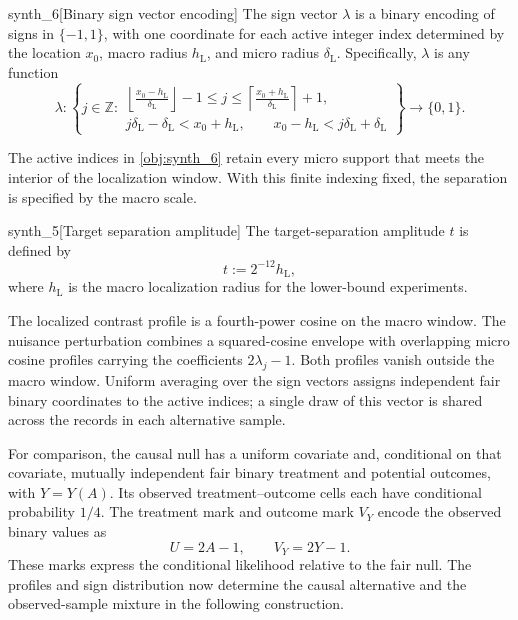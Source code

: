 \documentclass[11pt]{article}
\begin{document}
\begin{definitionv}{synth_6}[Binary sign vector encoding]
The sign vector \(\lambda\) is a binary encoding of signs in \(\{-1,1\}\), with one coordinate for each active integer index determined by the location \(x_0\), macro radius \(h_{\mathrm L}\), and micro radius \(\delta_{\mathrm L}\). Specifically, \(\lambda\) is any function
\[
\lambda:
\left\{
j\in\mathbb Z:
\begin{gathered}
\left\lfloor\frac{x_0-h_{\mathrm L}}{\delta_{\mathrm L}}\right\rfloor-1
\le j\le
\left\lceil\frac{x_0+h_{\mathrm L}}{\delta_{\mathrm L}}\right\rceil+1,\\
j\delta_{\mathrm L}-\delta_{\mathrm L}<x_0+h_{\mathrm L},
\qquad
x_0-h_{\mathrm L}<j\delta_{\mathrm L}+\delta_{\mathrm L}
\end{gathered}
\right\}
\longrightarrow \{0,1\}.
\]
\end{definitionv}

The active indices in \cref{obj:synth_6} retain every micro support that meets the interior of the localization window. With this finite indexing fixed, the separation is specified by the macro scale.

\begin{definitionv}{synth_5}[Target separation amplitude]
The target-separation amplitude \(t\) is defined by
\[
t := 2^{-12}h_{\mathrm L},
\]
where \(h_{\mathrm L}\) is the macro localization radius for the lower-bound experiments.
\end{definitionv}

The localized contrast profile  is a fourth-power cosine on the macro window. The nuisance perturbation  combines a squared-cosine envelope with overlapping micro cosine profiles carrying the coefficients \(2\lambda_j-1\). Both profiles vanish outside the macro window. Uniform averaging over the sign vectors assigns independent fair binary coordinates to the active indices; a single draw of this vector is shared across the records in each alternative sample.

For comparison, the causal null  has a uniform covariate and, conditional on that covariate, mutually independent fair binary treatment and potential outcomes, with \(Y=Y(A)\). Its observed treatment--outcome cells each have conditional probability \(1/4\). The treatment mark  and outcome mark \(V_Y\) encode the observed binary values as
\[
U=2A-1,\qquad V_Y=2Y-1.
\]
These marks express the conditional likelihood relative to the fair null. The profiles and sign distribution now determine the causal alternative  and the observed-sample mixture  in the following construction.
\end{document}
